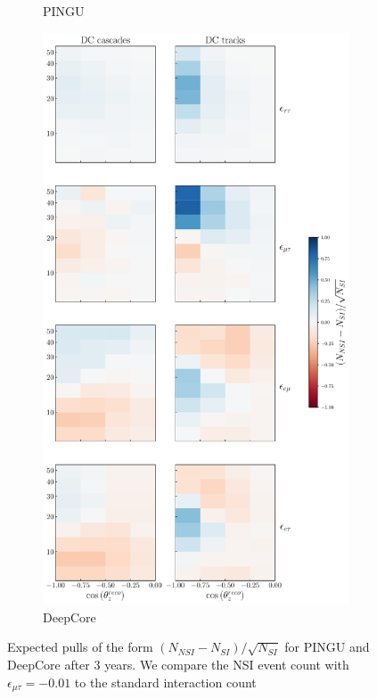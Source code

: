 \documentclass[draft=True]{revtex4-2}
\newcommand{\emt}{\ensuremath{\epsilon_{\mu\tau}}}
\begin{document}
{{\begin{figure}[t]
\begin{center}
\begin{subfigure}{0.38\textwidth}
         \caption{PINGU}\label{fig:PINGU_event_pulls}
      \end{subfigure}
      \begin{subfigure}{0.4\textwidth}
         \includegraphics[width=1\linewidth]{figures/DC_event_pulls.pdf}
         \caption{DeepCore}\label{fig:DC_event_pulls}
      \end{subfigure}
    \end{center}
   \caption{Expected pulls of the form $(N_{NSI} - N_{SI})/\sqrt{N_{SI}}$ for PINGU and DeepCore after 3 years. We compare the NSI event count with $\emt=-0.01$
    to the standard interaction count}\label{fig:event_pulls} 
\end{figure}%



}}
\end{document}
